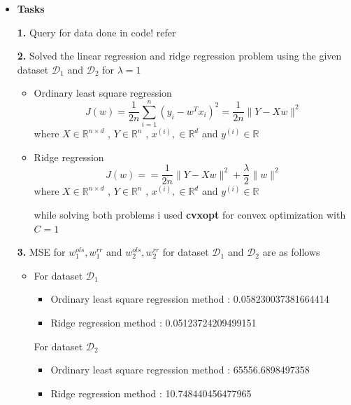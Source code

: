 \documentclass{article}
\begin{document}
\begin{itemize}
    \item \textbf{Tasks}
    
    \textbf{1.} Query for data done in code! refer 

    \textbf{2.} Solved the linear regression and ridge regression problem using the given dataset $\mathcal{D}_1$ and $\mathcal{D}_2$ for $\lambda = 1$
    \begin{itemize}
        \item Ordinary least square regression
        \[
        \boxed{J(w) = \frac{1}{2n} \sum_{i=1}^{n} (y_i - w^T x_i)^2 = \frac{1}{2n} \|Y - Xw\|^2}
        \]
        \hspace{110pt} where $X \in \mathbb{R}^{n \times d}$ , $Y \in \mathbb{R}^{n}$ ,  $x^{(i)}, \in \mathbb{R}^d$ and $y^{(i)} \in \mathbb{R}$ 

        \item Ridge regression
        \[
        \boxed{J(w) = = \frac{1}{2n} \|Y - Xw\|^2 + \frac{\lambda}{2} \|w\|^2}
        \]
        \hspace{110pt} where $X \in \mathbb{R}^{n \times d}$ , $Y \in \mathbb{R}^{n}$ ,  $x^{(i)}, \in \mathbb{R}^d$ and $y^{(i)} \in \mathbb{R}$ 
        \vspace{7pt}

        while solving both problems i used \textbf{cvxopt} for convex optimization with $C=1$ 
    \end{itemize}


    \textbf{3.} MSE for $w_1^{ols},w_1^{rr}$ and $w_2^{ols},w_2^{rr}$ for dataset $\mathcal{D}_1$ and $\mathcal{D}_2$ are as follows
    \begin{itemize}
        \item For dataset $\mathcal{D}_1$
        \begin{itemize}
            \item Ordinary least square regression method : 0.058230037381664414
            \item Ridge regression method : 0.05123724209499151
        \end{itemize}
        For dataset $\mathcal{D}_2$ 
        \begin{itemize}
            \item Ordinary least square regression method : 65556.6898497358
            \item Ridge regression method : 10.748440456477965
        \end{itemize}
    \end{itemize}


\end{itemize}
\end{document}
